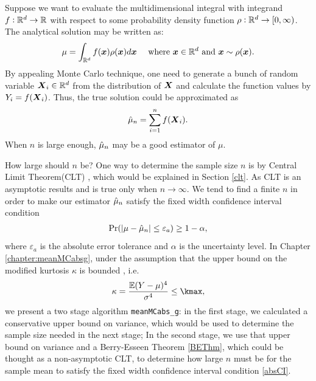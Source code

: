 \documentclass{iitthesis}
\begin{document}
Suppose we want to evaluate the multidimensional integral with integrand $f:\mathbb{R}^d \to \mathbb{R}$ with respect to some probability density function $\rho: \mathbb{R}^d \to [0,\infty)$.
The analytical solution may be written as:
$$\mu = \int_{\mathbb{R}^d}f(\boldsymbol{x})\rho(\boldsymbol{x})d\boldsymbol{x} \quad \text{   where } \boldsymbol{x} \in \mathbb{R}^d \text{ and } \boldsymbol{x} \sim \rho(\boldsymbol{x}).$$
By appealing Monte Carlo technique, one need to generate a bunch of random variable $\boldsymbol{X}_i \in \mathbb{R}^d$ from the distribution of $\boldsymbol{X}$ and calculate the function values by $Y_i = f(\boldsymbol{X}_i)$. Thus, the true solution could be approximated as $$\hat{\mu}_n = \sum_{i=1}^n f(\boldsymbol{X}_i).$$
When $n$ is large enough, $\hat{\mu}_n$ may be a good estimator of $\mu$.

How large should $n$ be? One way to determine the sample size $n$ is by Central Limit Theorem(CLT) \cite{LB10},  which would be explained in Section \ref{clt}. As CLT is an asymptotic results and is true only when $n \to \infty$. We tend to find a finite $n$ in order to make our estimator $\hat{\mu}_n$ satisfy the fixed width confidence interval condition 
\begin{align}\label{absCI}
\Pr(\left \lvert \mu-\hat{\mu}_n \right \rvert \leq \varepsilon_a) \geq 1-\alpha,
\end{align}
where $\varepsilon_a$ is the absolute error tolerance and $\alpha$ is the uncertainty level. 
In Chapter \ref{chapter:meanMCabsg}, under the assumption that the upper bound on the modified kurtosis $\kappa$ is bounded \cite{HJLO12}, i.e.
\begin{align}
\kappa = \frac{\e(Y-\mu)^4}{\sigma^4} \leq \kmax,
\end{align}
we present a two stage algorithm {\tt meanMCabs\_g}: in the first stage, we calculated a conservative upper bound on variance, which would be used to determine the sample size needed in the next stage; In the second stage, we use that upper bound on variance and a Berry-Esseen Theorem \ref{BEThm}, which could be thought as a non-asymptotic CLT, to determine how large $n$ must be for the sample mean to satisfy the fixed width confidence interval condition \eqref{absCI}.
\end{document}
